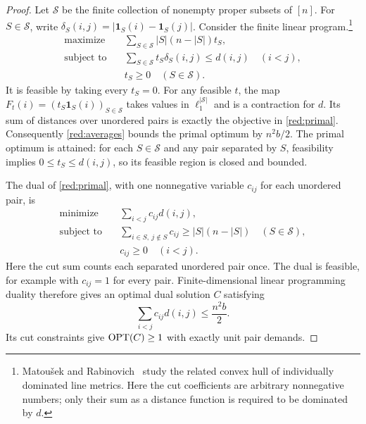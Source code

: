 \begin{proof}
Let $\mathcal S$ be the finite collection of nonempty proper subsets of
$[n]$.  For $S\in\mathcal S$, write
$\delta_S(i,j)=|\mathbf 1_S(i)-\mathbf 1_S(j)|$.  Consider the finite
linear program.\footnote{Matou\v{s}ek and
Rabinovich~\cite{MR01} study the related convex hull of individually
dominated line metrics. Here the cut coefficients are arbitrary
nonnegative numbers; only their sum as a distance function is required
to be dominated by $d$.}
\begin{equation}
\label{red:primal}
\begin{aligned}
\text{maximize}\quad &
\sum_{S\in\mathcal S}|S|(n-|S|)t_S,\\
\text{subject to}\quad &
\sum_{S\in\mathcal S}t_S\delta_S(i,j)\leq d(i,j)
\quad (i<j),\\
&t_S\geq 0\quad(S\in\mathcal S).
\end{aligned}
\end{equation}
It is feasible by taking every $t_S=0$.  For any feasible $t$, the map
$F_t(i)=(t_S\mathbf 1_S(i))_{S\in\mathcal S}$ takes values in
$\ell_1^{|\mathcal S|}$ and is a contraction for $d$.  Its sum of
distances over unordered pairs is exactly the objective in
\eqref{red:primal}.  Consequently \eqref{red:averages} bounds the primal
optimum by $n^2b/2$.  The primal optimum is attained: for each
$S\in\mathcal S$ and any pair separated by $S$, feasibility implies
$0\leq t_S\leq d(i,j)$, so its feasible region is closed and bounded.

The dual of \eqref{red:primal}, with one nonnegative variable $c_{ij}$
for each unordered pair, is
\begin{equation}
\label{red:dual}
\begin{aligned}
\text{minimize}\quad &\sum_{i<j}c_{ij}d(i,j),\\
\text{subject to}\quad &
\sum_{i\in S,\ j\notin S}c_{ij}\geq |S|(n-|S|)
\quad(S\in\mathcal S),\\
&c_{ij}\geq 0\quad(i<j).
\end{aligned}
\end{equation}
Here the cut sum counts each separated unordered pair once.
The dual is feasible, for example with $c_{ij}=1$ for every pair.
Finite-dimensional linear programming duality therefore gives an
optimal dual solution $C$ satisfying
\begin{equation}
\label{red:dual-objective}
\sum_{i<j}c_{ij}d(i,j)\leq \frac{n^2b}{2}.
\end{equation}
Its cut constraints give $\operatorname{OPT}(C)\geq1$ with exactly unit pair demands.


\end{proof}
